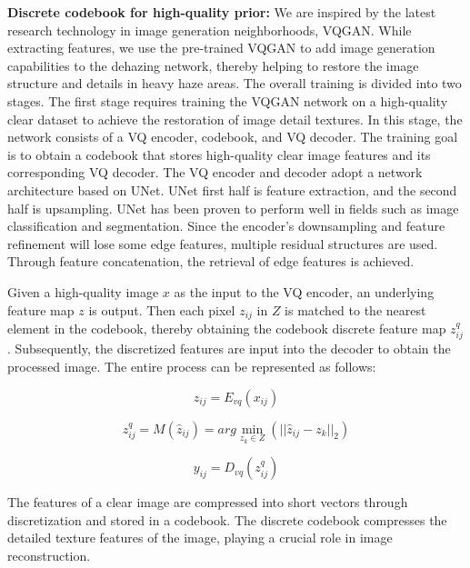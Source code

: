\documentclass[lettersize,journal]{IEEEtran}
\begin{document}
{\bf{Discrete codebook for high-quality prior:}}
We are inspired by the latest research technology in image generation neighborhoods, VQGAN\cite{esser2021taming}. While extracting features, we use the pre-trained VQGAN to add image generation capabilities to the dehazing network, thereby helping to restore the image structure and details in heavy haze areas. The overall training is divided into two stages. The first stage requires training the VQGAN network on a high-quality clear dataset to achieve the restoration of image detail textures. In this stage, the network consists of a VQ encoder, codebook, and VQ decoder. The training goal is to obtain a codebook that stores high-quality clear image features and its corresponding VQ decoder. The VQ encoder and decoder adopt a network architecture based on UNet\cite{ronneberger2015u}. UNet first half is feature extraction, and the second half is upsampling. UNet has been proven to perform well in fields such as image classification and segmentation. Since the encoder's downsampling and feature refinement will lose some edge features, multiple residual structures are used. Through feature concatenation, the retrieval of edge features is achieved.

Given a high-quality image $x$ as the input to the VQ encoder, an underlying feature map $z$ is output. Then each pixel $z_{ij}$ in $Z$ is matched to the nearest element in the codebook, thereby obtaining the codebook discrete feature map $z^{q}_{ij}$. Subsequently, the discretized features are input into the decoder to obtain the processed image. The entire process can be represented as follows:

\begin{equation}
\label{vq_equation_1}
z_{ij} = E_{vq}(x_{ij})
\end{equation}

\begin{equation}
\label{vq_equation_2}
z_{ij}^{q} = M(\widehat{z}_{ij}) = arg \min_{z_{k} \in Z} (|| \widehat{z}_{ij} - z_{k} ||_{2})
\end{equation}

\begin{equation}
\label{vq_equation_3}
y_{ij} = D_{vq}(z_{ij}^{q})
\end{equation}

The features of a clear image are compressed into short vectors through discretization and stored in a codebook. The discrete codebook compresses the detailed texture features of the image, playing a crucial role in image reconstruction.
\end{document}
